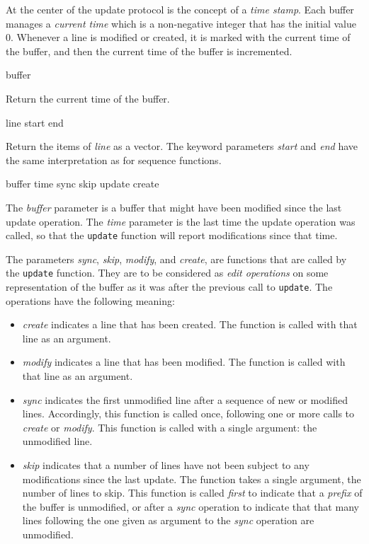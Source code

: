 At the center of the update protocol is the concept of a \emph{time
  stamp}.  Each buffer manages a \emph{current time} which is a
non-negative integer that has the initial value $0$.  Whenever a line
is modified or created, it is marked with the current time of the
buffer, and then the current time of the buffer is incremented.

 {buffer}

Return the current time of the buffer.

 {line \key start end}

Return the items of \textit{line} as a vector.  The keyword parameters
\textit{start} and \textit{end} have the same interpretation as for
\cl{} sequence functions.

 {buffer time sync skip update create}

The \textit{buffer} parameter is a buffer that might have been
modified since the last update operation.  The \textit{time} parameter
is the last time the update operation was called, so that the
\texttt{update} function will report modifications since that time. 

The parameters \textit{sync}, \textit{skip}, \textit{modify}, and
\textit{create}, are functions that are called by the \texttt{update}
function.  They are to be considered as \emph{edit operations} on some
representation of the buffer as it was after the previous call to
\texttt{update}.  The operations have the following meaning:

\begin{itemize}
\item \textit{create} indicates a line that has been created.  The
  function is called with that line as an argument.
\item \textit{modify}%
  indicates a line that has been modified.  The
  function is called with that line as an argument.
\item \textit{sync} indicates the first unmodified line after a
  sequence of new or modified lines.  Accordingly, this function is
  called once, following one or more calls to \textit{create} or
  \textit{modify}.  This function is called with a single argument:
  the unmodified line.
\item \textit{skip} indicates that a number of lines have not been
  subject to any modifications since the last update.  The function
  takes a single argument, the number of lines to skip.  This function
  is called \emph{first} to indicate that a \emph{prefix} of the
  buffer is unmodified, or after a \emph{sync} operation to indicate
  that that many lines following the one given as argument to the
  \textit{sync} operation are unmodified.%
\end{itemize}

